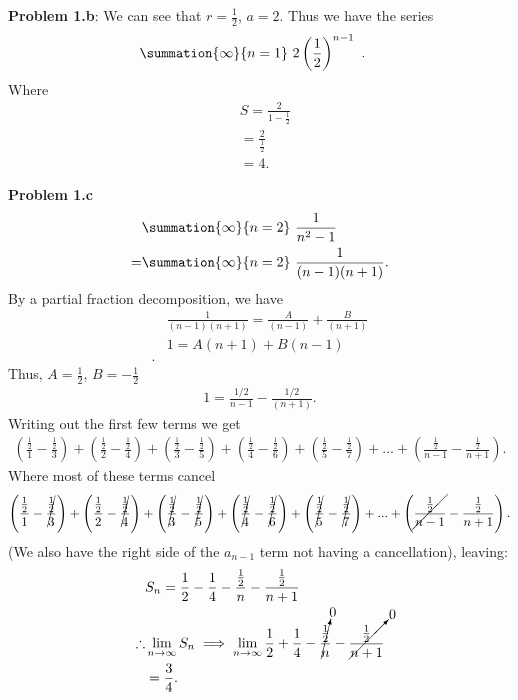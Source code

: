 \documentclass{report}
\begin{document}
    \bigbreak \noindent 
    \textbf{Problem 1.b}: We can see that $r=\frac{1}{2}$, $a=2$. Thus we have the series
    \begin{align*}
        &\summation{\infty}{n=1}\ 2\left(\frac{1}{2}\right)^{n-1}\ 
    .\end{align*}
    Where 
    \begin{align*}
        &S = \frac{2}{1-\frac{1}{2}} \\
        &= \frac{2}{\frac{1}{2}} \\
        &= 4
    .\end{align*}

    \pagebreak \bigbreak \noindent 
    \textbf{Problem 1.c}
    \begin{align*}
          &\summation{\infty}{n=2}\ \frac{1}{n^{2} - 1} \\
          =&\summation{\infty}{n=2}\ \frac{1}{(n-1)(n+1)} 
    .\end{align*}
    By a partial fraction decomposition, we have
    \begin{align*}
        &\frac{1}{(n-1)(n+1)} = \frac{A}{(n-1)} + \frac{B}{(n+1)} \\
        &1 = A(n+1) + B(n-1) \\
    .\end{align*}
    \bigbreak \noindent 
    Thus, $A=\frac{1}{2}$, $B=-\frac{1}{2}$
    \begin{align*}
        1 = \frac{1/2}{n-1} - \frac{1/2}{(n+1)}
    .\end{align*}
    Writing out the first few terms we get 
    \begin{align*}
        \left(\frac{\frac{1}{2}}{1}-\frac{\frac{1}{2}}{3}\right) + \left(\frac{\frac{1}{2}}{2} - \frac{\frac{1}{2}}{4}\right)  +\left(\frac{\frac{1}{2}}{3} - \frac{\frac{1}{2}}{5}\right) + \left(\frac{\frac{1}{2}}{4} -\frac{\frac{1}{2}}{6}\right) + \left(\frac{\frac{1}{2}}{5} - \frac{\frac{1}{2}}{7}\right) + ... + \left(\frac{\frac{1}{2}}{n-1} - \frac{\frac{1}{2}}{n+1}\right)
    .\end{align*}
    Where most of these terms cancel 
    \begin{align*}
        \left(\frac{\frac{1}{2}}{1}-\cancel{\frac{\frac{1}{2}}{3}}\right) + \left(\frac{\frac{1}{2}}{2} - \cancel{\frac{\frac{1}{2}}{4}}\right)  +\left(\cancel{\frac{\frac{1}{2}}{3}} - \cancel{\frac{\frac{1}{2}}{5}}\right) + \left(\cancel{\frac{\frac{1}{2}}{4}} -\cancel{\frac{\frac{1}{2}}{6}}\right) + \left(\cancel{\frac{\frac{1}{2}}{5}} - \cancel{\frac{\frac{1}{2}}{7}}\right) + ... + \left(\cancel{\frac{\frac{1}{2}}{n-1}} - \frac{\frac{1}{2}}{n+1}\right)
    .\end{align*}
    \bigbreak \noindent 
    (We also have the right side of the $a_{n-1}$ term not having a cancellation), leaving:
    \begin{align*}
        &S_{n} = \frac{1}{2} - \frac{1}{4}- \frac{\frac{1}{2}}{n} - \frac{\frac{1}{2}}{n+1} \\
        \therefore&\lim\limits_{n \to \infty}{S_{n}} \implies \lim\limits_{n \to \infty}{\frac{1}{2}+\frac{1}{4}-\cancelto{0}{\frac{\frac{1}{2}}{n}}- \cancelto{0}{\frac{\frac{1}{2}}{n+1}}} \\
        &=\frac{3}{4}
    .\end{align*}
\end{document}
